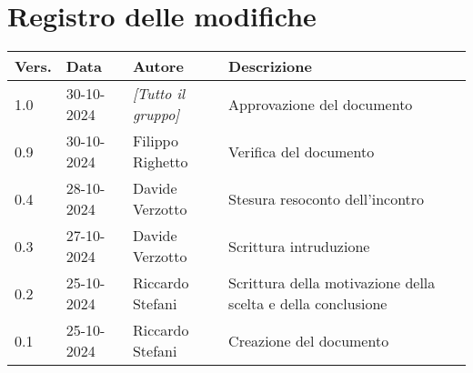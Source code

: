 \section*{Registro delle modifiche}

\begin{table}[h]
    \centering
    \begin{tabular}{|l|l|l|p{5cm}|}
        \hline
        \rowcolor[gray]{0.9}
        \textbf{Vers.} & \textbf{Data} & \textbf{Autore} & \textbf{Descrizione}\\
        \hline
        1.0 & 30-10-2024 & \emph{[Tutto il gruppo]} & Approvazione del documento\\
        \hline
        0.9 & 30-10-2024 & Filippo Righetto & Verifica del documento\\
        \hline
        0.4 & 28-10-2024 & Davide Verzotto & Stesura resoconto dell'incontro\\
        \hline
        0.3 & 27-10-2024 & Davide Verzotto & Scrittura intruduzione\\
        \hline
        0.2 & 25-10-2024 & Riccardo Stefani & Scrittura della motivazione della scelta e della conclusione\\
        \hline
        0.1 & 25-10-2024 & Riccardo Stefani & Creazione del documento\\
        \hline
    \end{tabular}
\end{table}
